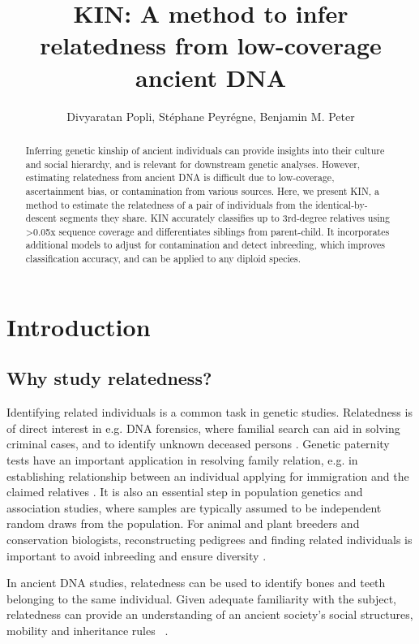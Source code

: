 \documentclass[12pt, letterpaper]{article}
\title{KIN: A method to infer relatedness from low-coverage ancient DNA}
\author{Divyaratan Popli, Stéphane Peyrégne, Benjamin M. Peter}
\begin{document}
\maketitle

\begin{abstract}

\noindent Inferring genetic kinship of ancient individuals can provide insights into their culture and social hierarchy, and is relevant for downstream genetic analyses. However, estimating relatedness from ancient DNA is difficult due to low-coverage, ascertainment bias, or contamination from various sources. Here, we present KIN, a method to estimate the relatedness of a pair of individuals from the identical-by-descent segments they share. KIN accurately classifies up to 3rd-degree relatives using >0.05x sequence coverage and differentiates siblings from parent-child. It incorporates additional models to adjust for contamination and detect inbreeding, which improves classification accuracy, and can be applied to any diploid species. 
\end{abstract}

\section{Introduction}

\subsection{Why study relatedness?}

Identifying related individuals is a common task in genetic studies. Relatedness is of direct interest in e.g. DNA forensics, where familial search can aid in solving criminal cases, and to identify unknown deceased persons \cite{murphy_law_2018,ram_genealogy_2018}. Genetic paternity tests have an important application in resolving family relation, e.g. in establishing relationship between an individual applying for immigration and the claimed relatives \cite{egeland_beyond_2000}. It is also an essential step in population genetics and association studies, where samples are typically assumed to be independent random draws from the population. For animal and plant breeders and conservation biologists, reconstructing pedigrees and finding related individuals is important to avoid inbreeding and ensure diversity \cite{habier_impact_2007,oliehoek_estimating_2006,kardos_measuring_2015}.

In ancient DNA studies, relatedness can be used to identify bones and teeth belonging to the same individual. Given adequate familiarity with the subject, relatedness can provide an understanding of an ancient society's social structures, mobility and inheritance rules ~\cite{baca_ancient_2012,mittnik_kinship-based_2019,sikora_ancient_2017}.
\end{document}

